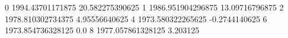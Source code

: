 0 1994.43701171875 20.582275390625
1 1986.951904296875 13.09716796875
2 1978.810302734375 4.95556640625
4 1973.580322265625 -0.2744140625
6 1973.854736328125 0.0
8 1977.057861328125 3.203125
